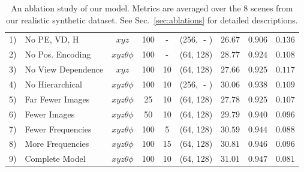 \documentclass[runningheads]{llncs}
\newcommand{\mbf}[1]{{\mathbf{#1}}}
\newcommand{\posxyz}{xyz}
\newcommand{\angletheta}{\theta}
\newcommand{\anglephi}{\phi}
\newcommand{\posall}{\posxyz\angletheta\anglephi}
\begin{document}
\begin{table}[t]
\begin{tabular}{@{\,}l@{\,\,}l|cccc|ccc@{\,}}
1) & No PE, VD, H & $\posxyz$ & 100 & -  & (256, \,\,-\,\,)    &  $26.67$ & $0.906$ & $0.136$  \\
2) & No Pos. Encoding & $\posall$  & 100 & -  &  (64, 128)     &  $28.77$ & $0.924$ & $0.108$  \\
3) & No View Dependence & $\posxyz$ & 100 & 10 &  (64, 128)    &  $27.66$ & $0.925$ & $0.117$  \\
4) & No Hierarchical & $\posall$ & 100 & 10 & (256, \,\,-\,\,) &  $30.06$ & $0.938$ & $0.109$  \\
\arrayrulecolor{gray}
\hline
\arrayrulecolor{black}
5) & Far Fewer Images & $\posall$  & 25  & 10 &  (64, 128)     &  $27.78$ & $0.925$ & $0.107$  \\
6) & Fewer Images  & $\posall$  & 50  & 10 &  (64, 128)        &  $29.79$ & $0.940$ & $0.096$  \\
\arrayrulecolor{gray}
\hline
\arrayrulecolor{black}
7) & Fewer Frequencies & $\posall$ & 100 & 5  &  (64, 128)     &  $30.59$ & $0.944$ & $0.088$  \\
8) & More Frequencies & $\posall$ & 100 & 15 &  (64, 128)      &  $30.81$ & $0.946$ & $0.096$  \\
\arrayrulecolor{gray}
\hline
\arrayrulecolor{black}
9) & Complete Model & $\posall$ & 100 & 10 & (64, 128)         &  $\mbf{31.01}$ & $\mbf{0.947}$ & $\mbf{0.081}$ 
\end{tabular}\vspace{2mm}
\caption{An ablation study of our model. Metrics are averaged over the 8 scenes from our realistic synthetic dataset. See Sec.~\ref{sec:ablations} for detailed descriptions.
}
\label{table:ablations}
\end{table}
\setlength{\tabcolsep}{1.4pt}
\end{document}

